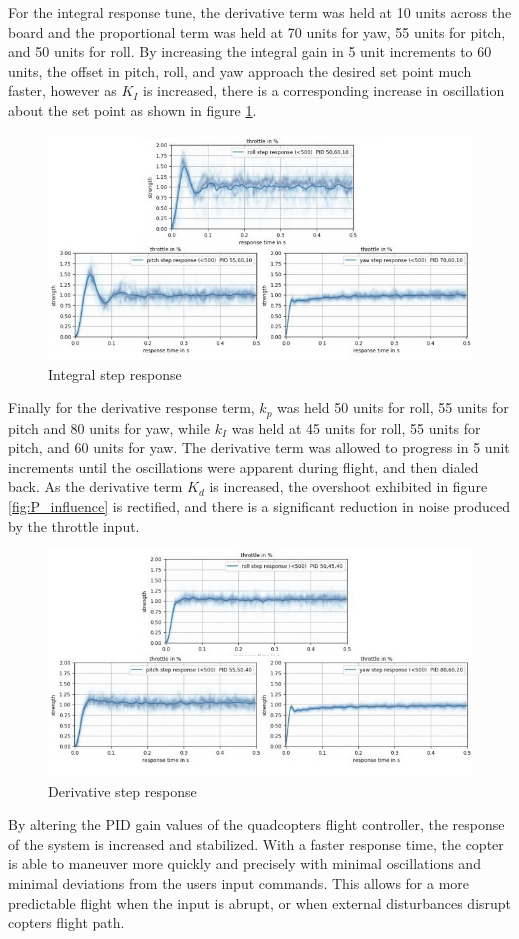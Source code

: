 \documentclass[11pt]{ucthesis}
\begin{document}
\noindent
For the integral response tune, the derivative term was held at 10 units across the board and the proportional term was held at 70 units for yaw, 55 units for pitch, and 50 units for roll. By increasing the integral gain in 5 unit increments to 60 units, the offset in pitch, roll, and yaw approach the desired set point much faster, however as $K_I$ is increased, there is a corresponding increase in oscillation about the set point as shown in figure \ref{fig:I_influence}.
\begin{figure}[H]
	\includegraphics[width=1\textwidth]{I_influence}
	\caption[Integral step response]{Integral step response}
	\label{fig:I_influence}
\end{figure}
\noindent
Finally for the derivative response term, $k_p$ was held 50 units for roll, 55 units for pitch and 80 units for yaw, while $k_I$ was held at 45 units for roll, 55 units for pitch, and 60 units for yaw. The derivative term was allowed to progress in 5 unit increments until the oscillations were apparent during flight, and then dialed back. As the derivative term $K_d$ is increased, the overshoot exhibited in figure \ref{fig:P_influence} is rectified, and there is a significant reduction in noise produced by the throttle input. 
\begin{figure}[H]
	\includegraphics[width=1\textwidth]{D_influence}
	\caption[Derivative step response]{Derivative step response }
	\label{fig:D_influence}
\end{figure}
\noindent
By altering the PID gain values of the quadcopters flight controller, the response of the system is increased and stabilized. With a faster response time, the copter is able to maneuver more quickly and precisely with minimal oscillations and minimal deviations from the users input commands. This allows for a more predictable flight when the input is abrupt, or when external disturbances disrupt copters flight path. 
\end{document}
